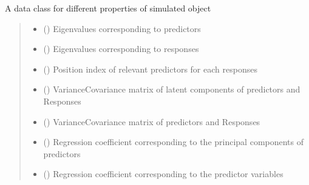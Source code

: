 \documentclass[letterpaper,10pt,english]{sphinxmanual}
\begin{document}

\begin{fulllineitems}
\label{\detokenize{Classes:pysimrel.Properties}}
\pysigstartsignatures
{}
\pysigstopsignatures
\sphinxAtStartPar
A data class for different properties of simulated object
\begin{quote}\begin{description}
\begin{itemize}
\item {} 
\sphinxAtStartPar
{} () \textendash{} Eigenvalues corresponding to predictors

\item {} 
\sphinxAtStartPar
{} () \textendash{} Eigenvalues corresponding to responses

\item {} 
\sphinxAtStartPar
{} () \textendash{} Position index of relevant predictors for each responses

\item {} 
\sphinxAtStartPar
{} () \textendash{} Variance\sphinxhyphen{}Covariance matrix of latent components of predictors and Responses

\item {} 
\sphinxAtStartPar
{} () \textendash{} Variance\sphinxhyphen{}Covariance matrix of predictors and Responses

\item {} 
\sphinxAtStartPar
{} () \textendash{} Regression coefficient corresponding to the principal components of predictors

\item {} 
\sphinxAtStartPar
{} () \textendash{} Regression coefficient corresponding to the predictor variables


\end{itemize}
\end{description}
\end{quote}
\end{fulllineitems}
\end{document}
